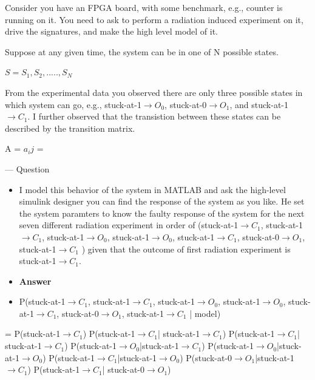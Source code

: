Consider you have an FPGA board, with some benchmark, e.g., counter is running on it. You need to  ask to perform a radiation induced experiment on it, drive the signatures, and make the high level model of it.

Suppose at any given time, the system can be in one of N possible states.

\begin{center}
$S = {S_1, S_2,....., S_N}$
\end{center}

From the experimental data you observed there are only three possible states in which system can go, e.g., stuck-at-1$\rightarrow O_{0}$, stuck-at-0$\rightarrow O_{1}$, and stuck-at-1$\rightarrow C_{1}$. I further observed that the transistion between these states can be described by the transition matrix.


\begin{center}


A = {$a_ij$} = 
\end{center}

--- Question

\begin{itemize}
\item I model this behavior of the system in MATLAB and ask the high-level simulink designer you can find the response of the system as you like. He set the system paramters to know the faulty response of the system for the next seven different radiation experiment in order of (stuck-at-1$\rightarrow C_{1}$, stuck-at-1$\rightarrow C_{1}$, stuck-at-1$\rightarrow O_{0}$, stuck-at-1$\rightarrow O_{0}$, stuck-at-1$\rightarrow C_{1}$, stuck-at-0$\rightarrow O_{1}$, stuck-at-1$\rightarrow C_{1}$  ) given that the outcome of first radiation experiment is stuck-at-1$\rightarrow C_{1}$.

\item \textbf{Answer}


\item P(stuck-at-1$\rightarrow C_{1}$, stuck-at-1$\rightarrow C_{1}$, stuck-at-1$\rightarrow O_{0}$, stuck-at-1$\rightarrow O_{0}$, stuck-at-1$\rightarrow C_{1}$, stuck-at-0$\rightarrow O_{1}$, stuck-at-1$\rightarrow C_{1}$ | model)
\end{itemize}

\hspace{0.2cm} = P(stuck-at-1$\rightarrow C_{1}$) P(stuck-at-1$\rightarrow C_{1}$| stuck-at-1$\rightarrow C_{1}$) P(stuck-at-1$\rightarrow C_{1}$| stuck-at-1$\rightarrow C_{1}$) P(stuck-at-1$\rightarrow O_{0}$|stuck-at-1$\rightarrow C_{1}$) P(stuck-at-1$\rightarrow O_{0}$|stuck-at-1$\rightarrow O_{0}$) P(stuck-at-1$\rightarrow C_{1}$|stuck-at-1$\rightarrow O_{0}$) P(stuck-at-0$\rightarrow O_{1}$|stuck-at-1$\rightarrow C_{1}$) P(stuck-at-1$\rightarrow C_{1}$| stuck-at-0$\rightarrow O_{1}$)

